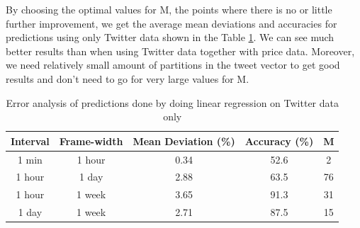 \documentclass[a4paper,11pt,oneside]{article}
\begin{document}
  By choosing the optimal values for M, the points where there is no or little further improvement, we get the average mean deviations and accuracies for predictions using only Twitter data shown in the Table \ref{tableTweets}. We can see much better results than when using Twitter data together with price data. Moreover, we need relatively small amount of partitions in the tweet vector to get good results and don't need to go for very large values for M.
  
  
  
  \begin{table}[h!]
  	\begin{center}
  		\begin{tabular}{|c c c c c|} 
  			\hline
  			Interval & Frame-width & Mean Deviation (\%) & Accuracy (\%) & M \\ [0.5ex] 
  			\hline\hline
  			1 min & 1 hour & 0.34 & 52.6 & 2\\
  			\hline
  			1 hour & 1 day & 2.88 & 63.5 & 76 \\
  			\hline
  			1 hour & 1 week & 3.65 & 91.3 & 31\\
  			\hline
  			1 day & 1 week & 2.71 & 87.5 & 15\\
  			\hline
  		\end{tabular}
  		\caption{Error analysis of predictions done by doing linear regression on Twitter data only}
  		\label{tableTweets}
  	\end{center}
  \end{table}
  
\end{document}

